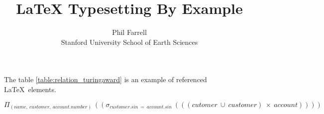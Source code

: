 \setlength{\topmargin}{-.5in}
\setlength{\textheight}{9in}
\setlength{\oddsidemargin}{.125in}
\setlength{\textwidth}{6.25in}

\title{LaTeX Typesetting By Example}
\author{Phil Farrell\\
Stanford University School of Earth Sciences}
\renewcommand{\today}{November 2, 1994}
\maketitle

The table \ref{table:relation_turingaward} is an example of referenced \LaTeX\ elements.

$$\Pi_{(name,\ customer,\ account.number)}\ ((\sigma_{customer.sin\ =\ account.sin}\ (((cutomer\ \cup\ customer)\ \times\ account))))$$


